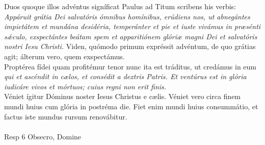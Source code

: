 \documentclass[options]{article}
\begin{document}
Duos quoque illos advéntus signíficat Paulus ad Titum scribens his verbis: \emph{Appáruit grátia Dei salvatóris ómnibus homínibus, erúdiens nos, ut abnegántes impietátem et mundána desidéria, temperánter et pie et iuste vivámus in præsénti s\'{æ}culo, exspectántes beátam spem et apparitiónem glóriæ magni Dei et salvatóris nostri Iesu Christi.} Viden, quómodo primum expréssit advéntum, de quo grátias agit; álterum vero, quem exspectámus.\\
Proptérea fídei quam profitémur tenor nunc ita est tráditus, ut credámus in eum \emph{qui et ascéndit in cælos, et consédit a dextris Patris. Et ventúrus est in glória iudicáre vivos et mórtuos; cuius regni non erit finis.}\\
Véniet ígitur Dóminus noster Iesus Christus e cælis. Véniet vero circa finem mundi huius cum glória in postréma die. Fiet enim mundi huius consummátio, et factus iste mundus rursum renovábitur.\\
\\
Resp 6 Obsecro, Domine\\
\\
\end{document}
